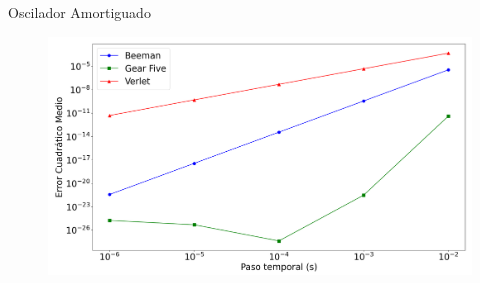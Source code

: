 \begin{frame}{Oscilador Amortiguado}
    \begin{figure}[H]
        \centering
        \includegraphics[width=1\linewidth]{pic/00-ejercicio1/ECMs.png}\label{fig:osciladore-ECM}
    \end{figure}
\end{frame}
